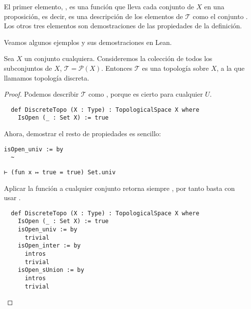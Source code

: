 El primer elemento, , es una función que lleva cada conjunto de $X$ en una proposición, es decir, es una descripción de los elementos de $\mathcal{T}$ como el conjunto . Los otros tres elementos son demostraciones de las propiedades de la definición.

Veamos algunos ejemplos y sus demostraciones en Lean.

\begin{example}\label{ex:topologia-discreta}
    Sea $X$ un conjunto cualquiera. Consideremos la colección de todos los subconjuntos de $X$, $\mathcal{T} = \mathcal{P}(X)$. Entonces $\mathcal{T}$ es una topología sobre $X$, a la que llamamos \textnormal{topología discreta}.
\end{example}

\begin{proof}
  Podemos describir $\mathcal T$ como , porque  es cierto para cualquier $U$.

  \begin{lstlisting}
  def DiscreteTopo (X : Type) : TopologicalSpace X where
    IsOpen (_ : Set X) := true \end{lstlisting}
  
  Ahora, demostrar el resto de propiedades es sencillo:

  \begin{minipage}[t]{0.58\textwidth}
\begin{lstlisting}[language=lean]
    isOpen_univ := by
  ~
\end{lstlisting}
\end{minipage}%
\hfill
\begin{minipage}[t]{0.40\textwidth}
\begin{lstlisting}[language=infoview]
  ⊢ (fun x ↦ true = true) Set.univ
\end{lstlisting}
\end{minipage}

Aplicar la función  a cualquier conjunto retorna siempre , por tanto basta con usar .

\begin{lstlisting}
  def DiscreteTopo (X : Type) : TopologicalSpace X where
    IsOpen (_ : Set X) := true
    isOpen_univ := by
      trivial
    isOpen_inter := by
      intros
      trivial
    isOpen_sUnion := by
      intros
      trivial
\end{lstlisting}

\end{proof}


